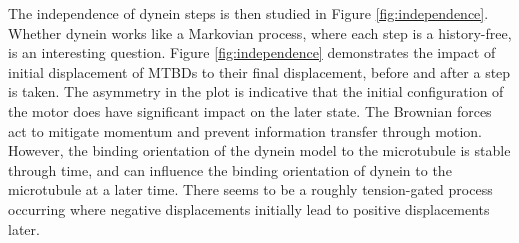 \documentclass[9pt,twocolumn,twoside]{article}
\begin{document}

The independence of dynein steps is then studied in Figure \ref{fig:independence}. Whether dynein works like a Markovian process, where each step is a history-free, is an interesting question. Figure \ref{fig:independence} demonstrates the impact of initial displacement of MTBDs to their final displacement, before and after a step is taken. The asymmetry in the plot is indicative that the initial configuration of the motor does have significant impact on the later state. The Brownian forces act to mitigate momentum and prevent information transfer through motion. However, the binding orientation of the dynein model to the microtubule is stable through time, and can influence the binding orientation of dynein to the microtubule at a later time. There seems to be a roughly tension-gated process occurring where negative displacements initially lead to positive displacements later.

\end{document}
